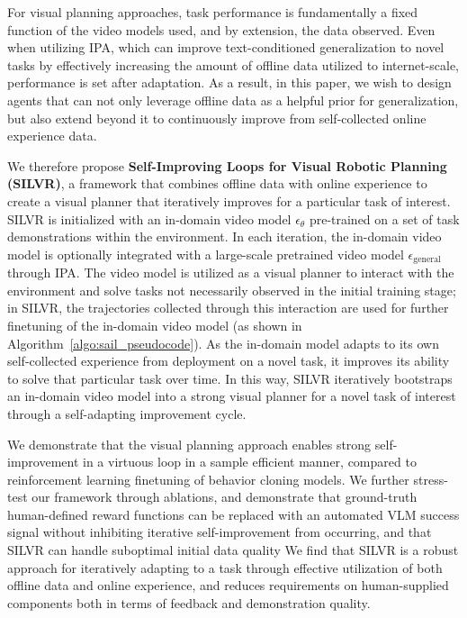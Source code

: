 For visual planning approaches, task performance is fundamentally a fixed function of the video models used, and by extension, the data observed.  Even when utilizing IPA, which can improve text-conditioned generalization to novel tasks by effectively increasing the amount of offline data utilized to internet-scale, performance is set after adaptation.  As a result, in this paper, we wish to design agents that can not only leverage offline data as a helpful prior for generalization, but also extend beyond it to continuously improve from self-collected online experience data.

We therefore propose \textbf{Self-Improving Loops for Visual Robotic Planning (SILVR)}, a framework that combines offline data with online experience to create a visual planner that iteratively improves for a particular task of interest.  SILVR is initialized with an in-domain video model $\epsilon_{\theta}$ pre-trained on a set of task demonstrations within the environment.  In each iteration, the in-domain video model is optionally integrated with a large-scale pretrained video model $\epsilon_{\text{general}}$ through IPA.  The video model is utilized as a visual planner to interact with the environment and solve tasks not necessarily observed in the initial training stage; in SILVR, the trajectories collected through this interaction are used for further finetuning of the in-domain video model (as shown in Algorithm~\ref{algo:sail_pseudocode}).  As the in-domain model adapts to its own self-collected experience from deployment on a novel task, it improves its ability to solve that particular task over time.  In this way, SILVR iteratively bootstraps an in-domain video model into a strong visual planner for a novel task of interest through a self-adapting improvement cycle.

We demonstrate that the visual planning approach enables strong self-improvement in a virtuous loop in a sample efficient manner, compared to reinforcement learning finetuning of behavior cloning models.  We further stress-test our framework through ablations, and demonstrate that ground-truth human-defined reward functions can be replaced with an automated VLM success signal without inhibiting iterative self-improvement from occurring, and that SILVR can handle suboptimal initial data quality
We find that SILVR is a robust approach for iteratively adapting to a task through effective utilization of both offline data and online experience, and reduces requirements on human-supplied components both in terms of feedback and demonstration quality.

